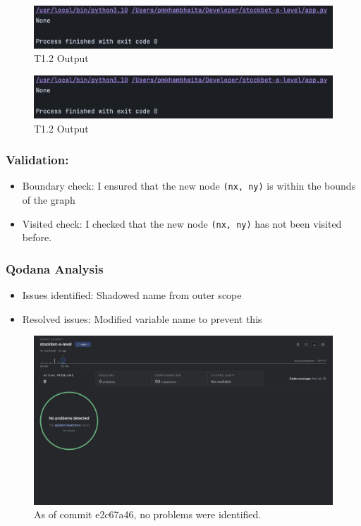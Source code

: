 \begin{figure}[htbp!]
    \centering
    \includegraphics[width=1\linewidth]{Images/t1.3,1.4.png}
    \caption{T1.2 Output}
    \label{fig:enter-label}
\end{figure}

\begin{figure}[htbp!]
    \centering
    \includegraphics[width=1\linewidth]{Images/t1.3,1.4.png}
    \caption{T1.2 Output}
    \label{fig:enter-label}
\end{figure}

\newpage

\subsubsection{Validation:}
\begin{itemize}
    \item Boundary check: I ensured that the new node \verb|(nx, ny)| is within the bounds of the graph
    \item Visited check: I checked that the new node \verb|(nx, ny)| has not been visited before.
\end{itemize}

\subsubsection{Qodana Analysis}
    \begin{itemize}
        \item Issues identified: Shadowed name from outer scope
        \item Resolved issues: Modified variable name to prevent this
    \end{itemize}

\begin{figure}[htbp!]
    \centering
    \includegraphics[width=1\linewidth]{Images/qodana-sai1.png}
    \caption{As of commit e2c67a46, no problems were identified.}
\end{figure}

